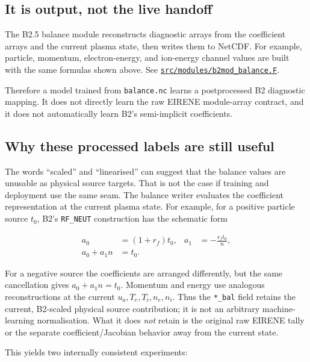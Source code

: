 \documentclass[11pt]{article}
\begin{document}
\subsection{It is output, not the live handoff}

The B2.5 balance module reconstructs diagnostic arrays from the coefficient arrays and the current plasma state, then writes them to NetCDF. For example, particle, momentum, electron-energy, and ion-energy channel values are built with the same formulas shown above. See
\href{https://github.com/iterorganization/B2.5/blob/cb7d15b2878074bb450666bebee4b1df02ef79e6/src/modules/b2mod_balance.F}{\texttt{src/modules/b2mod\_balance.F}}.

Therefore a model trained from \texttt{balance.nc} learns a postprocessed B2 diagnostic mapping. It does not directly learn the raw EIRENE module-array contract, and it does not automatically learn B2's semi-implicit coefficients.

\subsection{Why these processed labels are still useful}

The words ``scaled'' and ``linearised'' can suggest that the balance values are unusable as physical source targets. That is not the case if training and deployment use the same seam. The balance writer evaluates the coefficient representation at the current plasma state. For example, for a positive particle source \(t_0\), B2's \texttt{RF\_NEUT} construction has the schematic form

\begin{align}
a_0 &= (1+r_f)t_0, & a_1 &= -\frac{r_f t_0}{n},\\
a_0+a_1n &= t_0.
\end{align}

For a negative source the coefficients are arranged differently, but the same cancellation gives \(a_0+a_1n=t_0\). Momentum and energy use analogous reconstructions at the current \(u_a,T_e,T_i,n_e,n_i\). Thus the \texttt{*\_bal} field retains the current, B2-scaled physical source contribution; it is not an arbitrary machine-learning normalisation. What it does \emph{not} retain is the original raw EIRENE tally or the separate coefficient/Jacobian behavior away from the current state.

This yields two internally consistent experiments:
\end{document}

